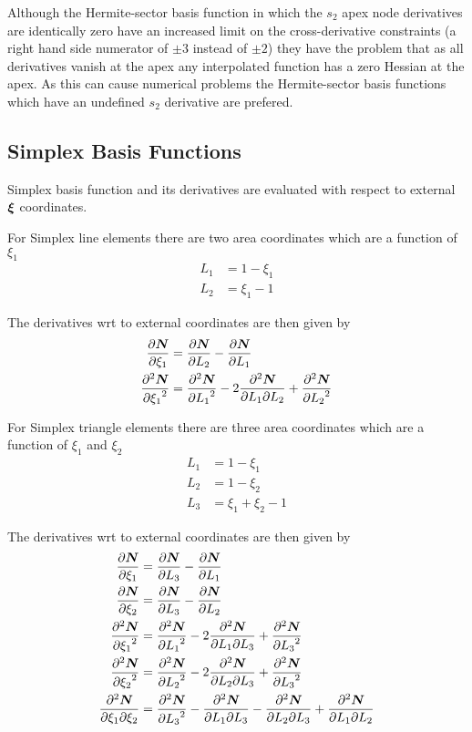 Although the Hermite-sector basis function in which the $s_{2}$ apex node
derivatives are identically zero have an increased limit on the
cross-derivative constraints (a right hand side numerator of $\pm 3$ instead
of $\pm 2$) they have the problem that as all derivatives vanish at the apex
any interpolated function has a zero Hessian at the apex. As this can cause
numerical problems the Hermite-sector basis functions which have an undefined
$s_{2}$ derivative are prefered.


\subsection{Simplex Basis Functions}

Simplex basis function and its derivatives are evaluated with respect to external $\vect{\xi}$ coordinates.

For Simplex line elements there are two area coordinates which are a function of $\xi_{1}$ \ie
\begin{align}
  L_{1} &= 1 - \xi_{1} \\
  L_{2} &= \xi_{1} - 1
\end{align}

The derivatives wrt to external coordinates are then given by 
\begin{align}
  \delby{\vect{\sbfnsymb{}}}{\xi_{1}} &= \delby{\vect{\sbfnsymb{}}}{L_{2}}-\delby{\vect{\sbfnsymb{}}}{L_{1}} \\
  \deltwosqby{\vect{\sbfnsymb{}}}{\xi_{1}} &= \deltwosqby{\vect{\sbfnsymb{}}}{L_{1}}-
  2\deltwoby{\vect{\sbfnsymb{}}}{L_{1}}{L_{2}}+\deltwosqby{\vect{\sbfnsymb{}}}{L_{2}}
\end{align}

For Simplex triangle elements there are three area coordinates which are a function of $\xi_{1}$ and
$\xi_{2}$ \ie
\begin{align} 
  L_{1} &= 1 - \xi_{1} \\
  L_{2} &= 1 - \xi_{2} \\
  L_{3} &= \xi_{1} + \xi_{2} - 1 
\end{align}

The derivatives wrt to external coordinates are then given by 
\begin{align}
  \delby{\vect{\sbfnsymb{}}}{\xi_{1}} &= \delby{\vect{\sbfnsymb{}}}{L_{3}}-\delby{\vect{\sbfnsymb{}}}{L_{1}} \\
  \delby{\vect{\sbfnsymb{}}}{\xi_{2}} &= \delby{\vect{\sbfnsymb{}}}{L_{3}}-\delby{\vect{\sbfnsymb{}}}{L_{2}} \\
  \deltwosqby{\vect{\sbfnsymb{}}}{\xi_{1}} &= \deltwosqby{\vect{\sbfnsymb{}}}{L_{1}}- 
  2\deltwoby{\vect{\sbfnsymb{}}}{L_{1}}{L_{3}}+\deltwosqby{\vect{\sbfnsymb{}}}{L_{3}} \\
  \deltwosqby{\vect{\sbfnsymb{}}}{\xi_{2}} &= \deltwosqby{\vect{\sbfnsymb{}}}{L_{2}}- 
  2\deltwoby{\vect{\sbfnsymb{}}}{L_{2}}{L_{3}}+\deltwosqby{\vect{\sbfnsymb{}}}{L_{3}} \\
  \deltwoby{\vect{\sbfnsymb{}}}{\xi_{1}}{\xi_{2}} &= \deltwosqby{\vect{\sbfnsymb{}}}{L_{3}}-
  \deltwoby{\vect{\sbfnsymb{}}}{L_{1}}{L_{3}}-\deltwoby{\vect{\sbfnsymb{}}}{L_{2}}{L_{3}}+
  \deltwoby{\vect{\sbfnsymb{}}}{L_{1}}{L_{2}}
\end{align}
  
